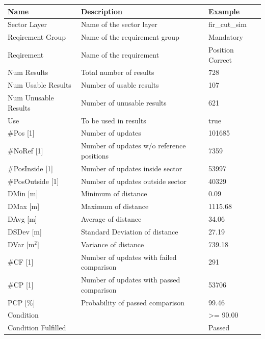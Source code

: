 \begin{center}
 \begin{table}[H]
  \begin{tabularx}{\textwidth}{ | l | X |  l | }
    \hline
    \textbf{Name} & \textbf{Description} & \textbf{Example} \\ \hline
    Sector Layer & Name of the sector layer & fir\_cut\_sim \\ \hline
    Reqirement Group & Name of the requirement group & Mandatory \\ \hline
    Reqirement & Name of the requirement & Position Correct \\ \hline
    Num Results & Total number of results & 728 \\ \hline
    Num Usable Results & Number of usable results & 107 \\ \hline
    Num Unusable Results & Number of unusable results & 621 \\ \hline
    Use & To be used in results & true \\ \hline
    \#Pos [1] & Number of updates & 101685 \\ \hline
    \#NoRef [1] & Number of updates w/o reference positions & 7359 \\ \hline
    \#PosInside [1] & Number of updates inside sector & 53997 \\ \hline
    \#PosOutside [1] & Number of updates outside sector & 40329 \\ \hline
    DMin [m] & Minimum of distance & 0.09 \\ \hline
    DMax [m] & Maximum of distance & 1115.68 \\ \hline
    DAvg [m] & Average of distance & 34.06 \\ \hline
    DSDev [m] & Standard Deviation of distance & 27.19 \\ \hline
    DVar [m$^2$] & Variance of distance & 739.18 \\ \hline
    \#CF [1] & Number of updates with failed comparison & 291 \\ \hline
    \#CP [1] & Number of updates with passed comparison  & 53706 \\ \hline
    PCP [\%] & Probability of passed comparison & 99.46 \\ \hline
    Condition &  & >= 90.00 \\ \hline
    Condition Fulfilled &  & Passed \\ \hline
\end{tabularx}
\end{table}
\end{center}

